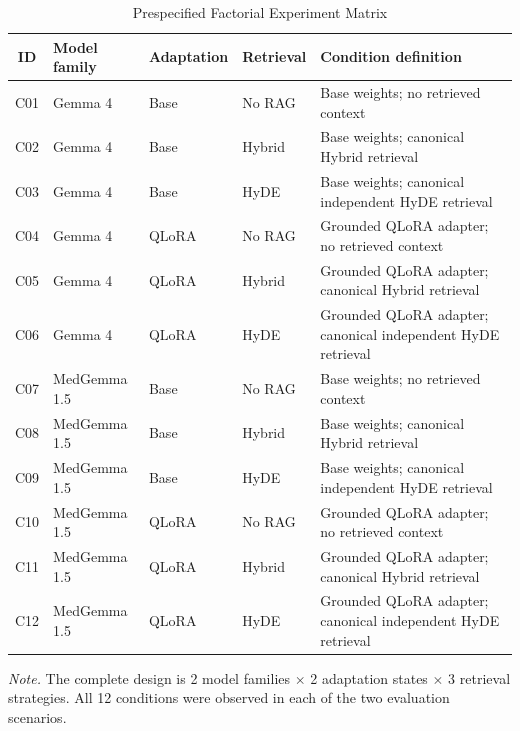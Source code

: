 \begin{table}[t]
\centering
\begin{threeparttable}
\caption{Prespecified Factorial Experiment Matrix}
\label{tab:factorial}
\scriptsize
\begin{tabular*}{\textwidth}{@{\extracolsep{\fill}}c l l l p{}@{}}
\toprule
ID & Model family & Adaptation & Retrieval & Condition definition \\
\midrule
C01 & Gemma 4 & Base & No RAG & Base weights; no retrieved context \\
C02 & Gemma 4 & Base & Hybrid & Base weights; canonical Hybrid retrieval \\
C03 & Gemma 4 & Base & HyDE & Base weights; canonical independent HyDE retrieval \\
C04 & Gemma 4 & QLoRA & No RAG & Grounded QLoRA adapter; no retrieved context \\
C05 & Gemma 4 & QLoRA & Hybrid & Grounded QLoRA adapter; canonical Hybrid retrieval \\
C06 & Gemma 4 & QLoRA & HyDE & Grounded QLoRA adapter; canonical independent HyDE retrieval \\
C07 & MedGemma 1.5 & Base & No RAG & Base weights; no retrieved context \\
C08 & MedGemma 1.5 & Base & Hybrid & Base weights; canonical Hybrid retrieval \\
C09 & MedGemma 1.5 & Base & HyDE & Base weights; canonical independent HyDE retrieval \\
C10 & MedGemma 1.5 & QLoRA & No RAG & Grounded QLoRA adapter; no retrieved context \\
C11 & MedGemma 1.5 & QLoRA & Hybrid & Grounded QLoRA adapter; canonical Hybrid retrieval \\
C12 & MedGemma 1.5 & QLoRA & HyDE & Grounded QLoRA adapter; canonical independent HyDE retrieval \\
\bottomrule
\end{tabular*}
\begin{tablenotes}[flushleft]
\item[] \textit{Note.} The complete design is 2 model families $\times$
2 adaptation states $\times$ 3 retrieval strategies. All 12 conditions were
observed in each of the two evaluation scenarios.
\end{tablenotes}
\end{threeparttable}
\end{table}

